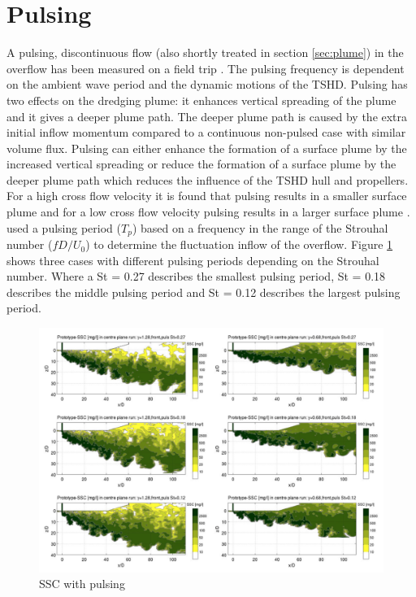 



\section{Pulsing}
A pulsing, discontinuous flow (also shortly treated in section \ref{sec:plume}) in the overflow has been measured on a field trip \citep{Dewit}. The pulsing frequency is dependent on the ambient wave period and the dynamic motions of the TSHD. Pulsing has two effects on the dredging plume: it enhances vertical spreading of the plume and it gives a deeper plume path. The deeper plume path is caused by the extra initial inflow momentum compared to a continuous non-pulsed case with similar volume flux. Pulsing can either enhance the formation of a surface plume by the increased vertical spreading or reduce the formation of a surface plume by the deeper plume path which reduces the influence of the TSHD hull and propellers. For a high cross flow velocity it is found that pulsing results in a smaller surface plume and for a low cross flow velocity pulsing results in a larger surface plume \citep{Dewit}. \newline 
\noindent \cite{Dewit} used a pulsing period ($T_p$) based on a frequency in the range of the Strouhal number ($fD / U_0$) to determine the fluctuation inflow of the overflow. Figure \ref{fig:pulsing} shows three cases with different pulsing periods depending on the Strouhal number. Where a St = 0.27 describes the smallest pulsing period, St = 0.18 describes the middle pulsing period and St = 0.12 describes the largest pulsing period. \newline

\begin{figure}[ht!]
    \centering
    \includegraphics[width = 1\textwidth]{Images/Pulsing.png}
    \caption{SSC with pulsing}
    \label{fig:pulsing}
\end{figure}

